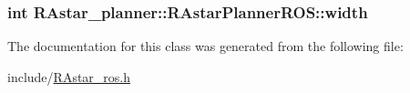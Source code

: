 \hypertarget{classRAstar__planner_1_1RAstarPlannerROS_accbb5d01b9d9630eb906c71fb255dd0d}{
\subsubsection[{width}]{\setlength{\rightskip}{0pt plus 5cm}int R\-Astar\-\_\-planner\-::\-R\-Astar\-Planner\-R\-O\-S\-::width}}\label{classRAstar__planner_1_1RAstarPlannerROS_accbb5d01b9d9630eb906c71fb255dd0d}


The documentation for this class was generated from the following file\-:\begin{DoxyCompactItemize}
\item 
include/\hyperlink{RAstar__ros_8h}{R\-Astar\-\_\-ros.\-h}\end{DoxyCompactItemize}
